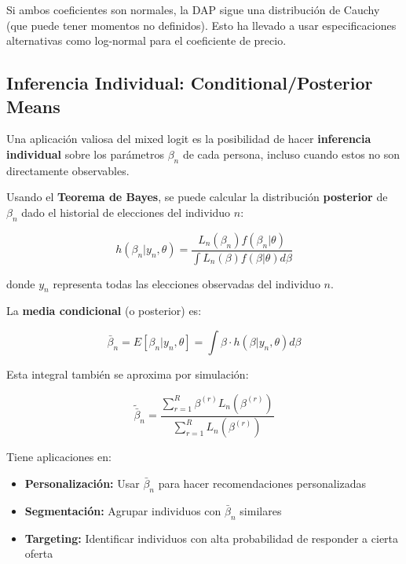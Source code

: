 \documentclass[
]{book}
\providecommand{\tightlist}{%
  \setlength{\itemsep}{0pt}\setlength{\parskip}{0pt}}
\begin{document}
Si ambos coeficientes son normales, la DAP sigue una distribución de Cauchy (que puede tener momentos no definidos). Esto ha llevado a usar especificaciones alternativas como log-normal para el coeficiente de precio.

\subsection{Inferencia Individual: Conditional/Posterior Means}\label{inferencia-individual-conditionalposterior-means}

Una aplicación valiosa del mixed logit es la posibilidad de hacer \textbf{inferencia individual} sobre los parámetros \(\beta_n\) de cada persona, incluso cuando estos no son directamente observables.

Usando el \textbf{Teorema de Bayes}, se puede calcular la distribución \textbf{posterior} de \(\beta_n\) dado el historial de elecciones del individuo \(n\):

\begin{equation}
h(\beta_n | y_n, \theta) = \frac{L_n(\beta_n) f(\beta_n | \theta)}{\int L_n(\beta) f(\beta | \theta) d\beta}
\label{eq:posterior}
\end{equation}

donde \(y_n\) representa todas las elecciones observadas del individuo \(n\).

La \textbf{media condicional} (o posterior) es:

\begin{equation}
\bar{\beta}_n = E[\beta_n | y_n, \theta] = \int \beta \cdot h(\beta | y_n, \theta) d\beta
\label{eq:condmean}
\end{equation}

Esta integral también se aproxima por simulación:

\begin{equation}
\tilde{\bar{\beta}}_n = \frac{\sum_{r=1}^R \beta^{(r)} L_n(\beta^{(r)})}{\sum_{r=1}^R L_n(\beta^{(r)})}
\label{eq:simcondmean}
\end{equation}

Tiene aplicaciones en:

\begin{itemize}
\tightlist
\item
  \textbf{Personalización:} Usar \(\bar{\beta}_n\) para hacer recomendaciones personalizadas
\item
  \textbf{Segmentación:} Agrupar individuos con \(\bar{\beta}_n\) similares
\item
  \textbf{Targeting:} Identificar individuos con alta probabilidad de responder a cierta oferta
\end{itemize}
\end{document}
